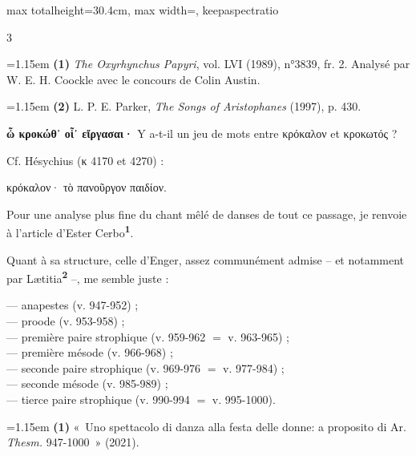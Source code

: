 \documentclass[11pt,twoside]{book}
\newcommand{\italique}[1]{\textit{#1}}
\newcommand{\citComm}[1]{\begin{quoting}[vskip=0.4pt,leftmargin=0.7em,rightmargin=0.2em]#1\end{quoting}}
\newcommand{\marqueur}[1]{\textsuperscript{\color{rubricRed}\textbf{#1}}}
\begin{document}
\begin{adjustbox}{max totalheight=30.4cm, max width=\textwidth, keepaspectratio}
\begin{minipage}{\textwidth}
{\begin{multicols}{3}
\par\vspace{1.5pt}
\par\vspace{1.2pt}\par\nopagebreak\vspace{1pt}\noindent\hangindent=1.15em {\color{sepiaNote}\textbf{(1)}} \italique{The Oxyrhynchus Papyri}, vol. LVI (1989), n°3839, fr. 2. Analysé par W. E. H. Coockle avec le concours de Colin Austin.
\par\vspace{1.5pt}
\noindent\hangindent=1.15em {\color{sepiaNote}\textbf{(2)}} L. P. E. Parker, \italique{The Songs of Aristophanes} (1997), p. 430.
\par\vspace{1.5pt}
 \textbf{ὦ κροκώθ᾽ οἷ᾽ εἴργασαι·} Y a-t-il un jeu de mots entre κρόκαλον et κροκωτός ?
\par\vspace{1.5pt}
\noindent Cf. Hésychius (κ 4170 et 4270) :
\citComm{κρόκαλον· τὸ πανοῦργον παιδίον.}
\par\vspace{1.5pt}
 \textbf{} Pour une analyse plus fine du chant mêlé de danses de tout ce passage, je renvoie à l'article d'Ester Cerbo\marqueur{1}.
\par\vspace{1.5pt}
\noindent Quant à sa structure, celle d'Enger, assez communément admise -- et notamment par Lætitia\marqueur{2} --, me semble juste  :
\citComm{--- anapestes (v. 947-952) ;\\
--- proode (v. 953-958) ;\\
--- première paire strophique (v. 959-962 $=$ v. 963-965) ;\\
--- première mésode (v. 966-968) ;\\
--- seconde paire strophique (v. 969-976 $=$ v. 977-984) ;\\
--- seconde mésode (v. 985-989) ;\\
--- tierce paire strophique (v. 990-994 $=$ v. 995-1000).}
\par\vspace{1.5pt}
\par\vspace{1.2pt}\par\nopagebreak\vspace{1pt}\noindent\hangindent=1.15em {\color{sepiaNote}\textbf{(1)}} «~Uno spettacolo di danza alla festa delle donne: a proposito di Ar. \italique{Thesm.} 947-1000~» (2021).

\end{multicols}}
\end{minipage}
\end{adjustbox}
\end{document}
